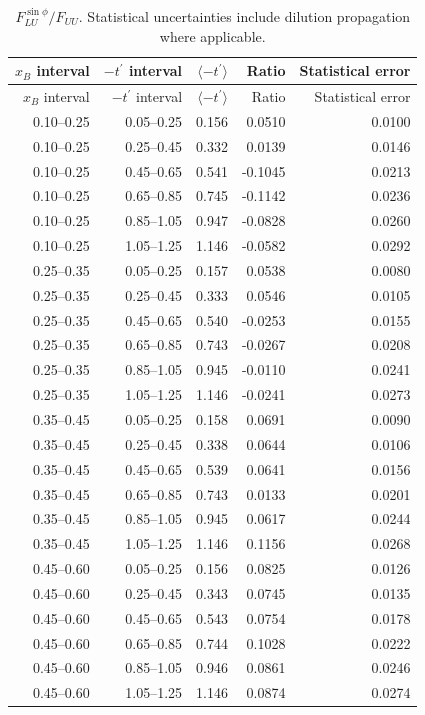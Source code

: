 \begin{longtable}{rrrrr}
\caption{$F_{LU}^{\sin\phi}/F_{UU}$. Statistical uncertainties include dilution propagation where applicable.}\label{tab:release_lu1}\\
\toprule
$x_B$ interval & $-t^\prime$ interval & $\langle-t^\prime\rangle$ & Ratio & Statistical error\\
\midrule\endfirsthead
\toprule $x_B$ interval & $-t^\prime$ interval & $\langle-t^\prime\rangle$ & Ratio & Statistical error\\\midrule\endhead
0.10--0.25 & 0.05--0.25 & 0.156 & 0.0510 & 0.0100\\
0.10--0.25 & 0.25--0.45 & 0.332 & 0.0139 & 0.0146\\
0.10--0.25 & 0.45--0.65 & 0.541 & -0.1045 & 0.0213\\
0.10--0.25 & 0.65--0.85 & 0.745 & -0.1142 & 0.0236\\
0.10--0.25 & 0.85--1.05 & 0.947 & -0.0828 & 0.0260\\
0.10--0.25 & 1.05--1.25 & 1.146 & -0.0582 & 0.0292\\
0.25--0.35 & 0.05--0.25 & 0.157 & 0.0538 & 0.0080\\
0.25--0.35 & 0.25--0.45 & 0.333 & 0.0546 & 0.0105\\
0.25--0.35 & 0.45--0.65 & 0.540 & -0.0253 & 0.0155\\
0.25--0.35 & 0.65--0.85 & 0.743 & -0.0267 & 0.0208\\
0.25--0.35 & 0.85--1.05 & 0.945 & -0.0110 & 0.0241\\
0.25--0.35 & 1.05--1.25 & 1.146 & -0.0241 & 0.0273\\
0.35--0.45 & 0.05--0.25 & 0.158 & 0.0691 & 0.0090\\
0.35--0.45 & 0.25--0.45 & 0.338 & 0.0644 & 0.0106\\
0.35--0.45 & 0.45--0.65 & 0.539 & 0.0641 & 0.0156\\
0.35--0.45 & 0.65--0.85 & 0.743 & 0.0133 & 0.0201\\
0.35--0.45 & 0.85--1.05 & 0.945 & 0.0617 & 0.0244\\
0.35--0.45 & 1.05--1.25 & 1.146 & 0.1156 & 0.0268\\
0.45--0.60 & 0.05--0.25 & 0.156 & 0.0825 & 0.0126\\
0.45--0.60 & 0.25--0.45 & 0.343 & 0.0745 & 0.0135\\
0.45--0.60 & 0.45--0.65 & 0.543 & 0.0754 & 0.0178\\
0.45--0.60 & 0.65--0.85 & 0.744 & 0.1028 & 0.0222\\
0.45--0.60 & 0.85--1.05 & 0.946 & 0.0861 & 0.0246\\
0.45--0.60 & 1.05--1.25 & 1.146 & 0.0874 & 0.0274\\
\bottomrule
\end{longtable}
